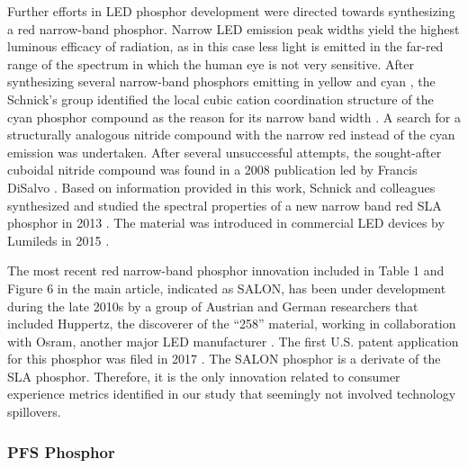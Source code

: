 \documentclass[parskip=full]{article}
\begin{document}
Further efforts in LED phosphor development were directed towards synthesizing a red narrow-band phosphor. Narrow LED emission peak widths yield the highest luminous efficacy of radiation, as in this case less light is emitted in the far-red range of the spectrum in which the human eye is not very sensitive. After synthesizing several narrow-band phosphors emitting in yellow \cite{Hppe2004} and cyan \cite{Kechele2009}, the Schnick’s group identified the local cubic cation coordination structure of the cyan phosphor compound as the reason for its narrow band width \cite{lumi2016narrow}. A search for a structurally analogous nitride compound with the narrow red instead of the cyan emission was undertaken. After several unsuccessful attempts, the sought-after cuboidal nitride compound was found in a 2008 publication led by Francis DiSalvo \cite{Park2008Sr}. Based on information provided in this work, Schnick and colleagues synthesized and studied the spectral properties of a new narrow band red SLA phosphor in 2013 \cite{schmidt2013new}\cite{Pust2014}\cite{schmidt2017phosphors}. The material was introduced in commercial LED devices by Lumileds in 2015 \cite{lumi2016narrow_whitepaper}. 

The most recent red narrow-band phosphor innovation included in Table 1 and Figure 6 in the main article, indicated as SALON, has been under development during the late 2010s by a group of Austrian and German researchers that included Huppertz, the discoverer of the “258” material, working in collaboration with Osram, another major LED manufacturer \cite{seibald2019phosphor}\cite{Hoerder2019}\cite{Hoerder2020}. The first U.S. patent application for this phosphor was filed in 2017 \cite{seibald2019phosphor}. The SALON phosphor is a derivate of the SLA phosphor. Therefore, it is the only innovation related to consumer experience metrics identified in our study that seemingly not involved technology spillovers.

\subsubsection{PFS Phosphor}
\end{document}

